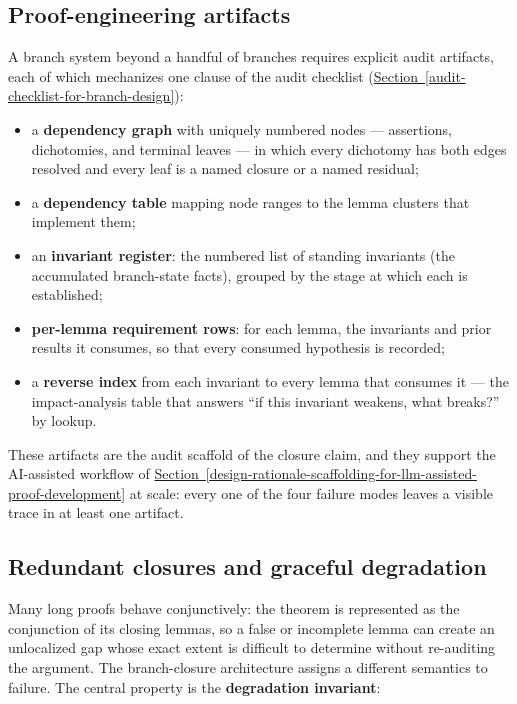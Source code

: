 \documentclass[
  11pt,
]{article}
\providecommand{\tightlist}{%
  \setlength{\itemsep}{0pt}\setlength{\parskip}{0pt}}
\theoremstyle{definition}
\newcommand{\secref}[1]{\hyperref[#1]{Section~\ref*{#1}}}
\begin{document}
\subsection{Proof-engineering
artifacts}\label{proof-engineering-artifacts}

A branch system beyond a handful of branches requires explicit audit
artifacts, each of which mechanizes one clause of the audit checklist
(\secref{audit-checklist-for-branch-design}):

\begin{itemize}
\tightlist
\item
  a \textbf{dependency graph} with uniquely numbered nodes ---
  assertions, dichotomies, and terminal leaves --- in which every
  dichotomy has both edges resolved and every leaf is a named closure or
  a named residual;
\item
  a \textbf{dependency table} mapping node ranges to the lemma clusters
  that implement them;
\item
  an \textbf{invariant register}: the numbered list of standing
  invariants (the accumulated branch-state facts), grouped by the stage
  at which each is established;
\item
  \textbf{per-lemma requirement rows}: for each lemma, the invariants
  and prior results it consumes, so that every consumed hypothesis is
  recorded;
\item
  a \textbf{reverse index} from each invariant to every lemma that
  consumes it --- the impact-analysis table that answers ``if this
  invariant weakens, what breaks?'' by lookup.
\end{itemize}

These artifacts are the audit scaffold of the closure claim,
and they support the AI-assisted workflow of \secref{design-rationale-scaffolding-for-llm-assisted-proof-development} at scale: every
one of the four failure modes leaves a visible trace in at least one
artifact.



\subsection{Redundant closures and graceful
degradation}\label{redundant-closures-and-graceful-degradation}

Many long proofs behave conjunctively: the theorem is represented as the
conjunction of its closing lemmas, so a false or incomplete lemma can
create an unlocalized gap whose exact extent is difficult to determine
without re-auditing the argument. The branch-closure architecture
assigns a different semantics to failure. The central property is the
\textbf{degradation invariant}:
\end{document}
